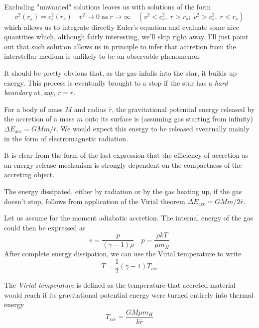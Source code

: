 \par Excluding "unwanted" solutions leaves us with solutions of the form 
\begin{equation*}
    v^{2}(r_{s}) = c_{s}^{2}(r_{s}) \quad v^{2}\to 0 \;\text{as}\; r\to\infty \quad  (v^{2} < c_{s}^{2},\; r > r_{s};\;v^{2} > c_{s}^{2},\;r < r_{s})
\end{equation*}
which allows us to integrate directly Euler's equation and evaluate some nice quantities which, although fairly interesting, we'll skip right away. I'll just point out that such solution allows us in principle to infer that accretion from the interstellar medium is unlikely to be an observable phenomenon.
\par It should be pretty obvious that, as the gas infalls into the star, it builds up energy. This process is eventually brought to a stop if the star has a \emph{hard boundary} at, say, $r = \bar{r}$.
\par For a body of mass $M$ and radius $\bar{r}$, the gravitational potential energy released by the accretion of a mass $m$ onto its surface is (assuming gas starting from infinity) $\Delta E_{\text{acc}} = GMm/\bar{r}$. We would expect this energy to be released eventually mainly in the form of electromagnetic radiation.
\par It is clear from the form of the last expression that the efficiency of accretion as an energy release mechanism is strongly dependent on the compactness of the accreting object.
\par The energy dissipated, either by radiation or by the gas heating up, if the gas doesn't stop, follows from application of the Virial theorem $\Delta E_{\text{acc}} = GMm/2\bar{r}$.
\par Let us assume for the moment adiabatic accretion. The internal energy of the gas could then be expressed as 
\begin{equation*}
    e = \frac{p}{(\gamma-1)\rho} \quad p = \frac{\rho k T}{\mu m_{H}}
\end{equation*}
After complete energy dissipation, we can use the Virial temperature to write 
\begin{equation*}
    T = \frac{1}{2}(\gamma -1) T_{vir}
\end{equation*}
\par The \emph{Virial temperature} is defined as the temperature that accreted material would reach if its gravitational potential energy were turned entirely into thermal energy
\begin{equation}
    T_{vir} = \frac{GM\mu m_{H}}{k\bar{r}}
    \label{eq:virial_temperature}
\end{equation}

